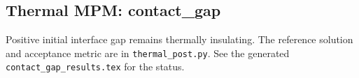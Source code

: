 \subsection{Thermal MPM: contact\_gap}
Positive initial interface gap remains thermally insulating. The reference solution and acceptance metric are in \texttt{thermal\_post.py}. See the generated \texttt{contact\_gap\_results.tex} for the status.
